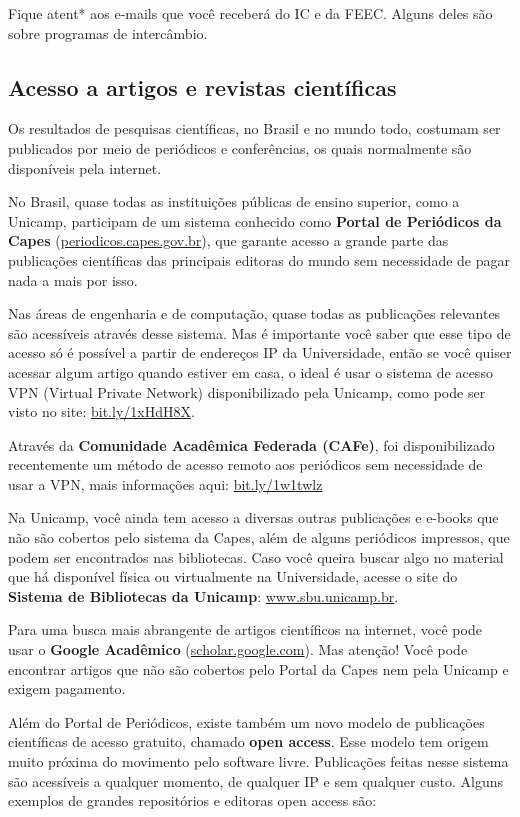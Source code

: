 Fique atent* aos e-mails que você receberá do IC e da FEEC. Alguns deles são
sobre programas de intercâmbio.

\subsection{Acesso a artigos e revistas científicas}

Os resultados de pesquisas científicas, no Brasil e no mundo todo, costumam ser
publicados por meio de periódicos e conferências, os quais normalmente são
disponíveis pela internet.

No Brasil, quase todas as instituições públicas de ensino superior, como a
Unicamp, participam de um sistema conhecido como \textbf{Portal de Periódicos
da Capes} (\url{periodicos.capes.gov.br}), que garante acesso a grande parte
das publicações científicas das principais editoras do mundo sem necessidade de
pagar nada a mais por isso.

Nas áreas de engenharia e de computação, quase todas as publicações relevantes
são acessíveis através desse sistema. Mas é importante você saber que esse tipo
de acesso só é possível a partir de endereços IP da Universidade, então se você
quiser acessar algum artigo quando estiver em casa, o ideal é usar o sistema de
acesso VPN (Virtual Private Network) disponibilizado pela Unicamp, como pode
ser visto no site: \url{bit.ly/1xHdH8X}.

Através da \textbf{Comunidade Acadêmica Federada (CAFe)}, foi disponibilizado
recentemente um método de acesso remoto aos periódicos sem necessidade de usar
a VPN, mais informações aqui: \url{bit.ly/1w1twlz}

Na Unicamp, você ainda tem acesso a diversas outras publicações e e-books que
não são cobertos pelo sistema da Capes, além de alguns periódicos impressos,
que podem ser encontrados nas bibliotecas. Caso você queira buscar algo no
material que há disponível física ou virtualmente na Universidade, acesse o
site do \textbf{Sistema de Bibliotecas da Unicamp}: \url{www.sbu.unicamp.br}.

Para uma busca mais abrangente de artigos científicos na internet, você pode
usar o \textbf{Google Acadêmico} (\url{scholar.google.com}). Mas atenção! Você
pode encontrar artigos que não são cobertos pelo Portal da Capes nem pela
Unicamp e exigem pagamento.

Além do Portal de Periódicos, existe também um novo modelo de publicações
científicas de acesso gratuito, chamado \textbf{open access}. Esse modelo tem
origem muito próxima do movimento pelo software livre. Publicações feitas nesse
sistema são acessíveis a qualquer momento, de qualquer IP e sem qualquer custo.
Alguns exemplos de grandes repositórios e editoras open access são:

